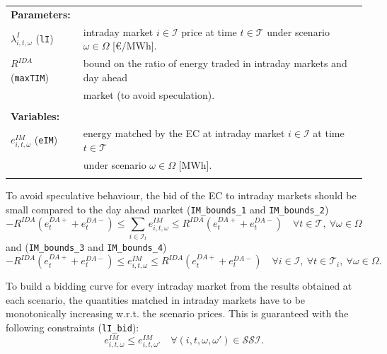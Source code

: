 \documentclass{article}
\begin{document}
\begin{tabularx}{\textwidth}{l l}
    
    \textbf{Parameters:} \\
    	$\lambda^I_{i, t, \omega}$ (\verb|lI|) & intraday market $i \in \mathcal{I}$ price at time $t \in \mathcal{T}$ under scenario $\omega \in \Omega$ [\euro/MWh]. \\
	$R^{IDA}$ (\verb|maxTIM|) & bound on the ratio of energy traded in intraday markets and day ahead \\
	& market (to avoid speculation).\\
    \\ 
       
    \textbf{Variables:} \\
    $e^{IM}_{i, t, \omega}$ (\verb|eIM|) & energy matched by the EC at intraday market $i \in \mathcal{I}$ at time $t \in \mathcal{T}$ \\
    & under scenario $\omega \in \Omega$ [MWh]. \\
	\\
\end{tabularx}

To avoid speculative behaviour, the bid of the EC to intraday markets should be small compared to the day ahead market (\verb|IM_bounds_1| and \verb|IM_bounds_2|)
\begin{equation} \label{EQ:DM_IM_1}
	-R^{IDA} (e^{DA+}_{t} + e^{DA-}_{t})  \leq \sum_{i \in \mathcal{I}_t} e^{IM}_{i, t, \omega} \leq R^{IDA} (e^{DA+}_{t} + e^{DA-}_{t}) \quad \forall t \in \mathcal{T}, \ \forall \omega \in \Omega
\end{equation}
and (\verb|IM_bounds_3| and \verb|IM_bounds_4|)
\begin{equation} \label{EQ:IM_bounds_3-4}
	-R^{IDA} (e^{DA+}_{t} + e^{DA-}_{t}) \leq e^{IM}_{i, t, \omega} \leq R^{IDA} (e^{DA+}_{t} + e^{DA-}_{t}) \quad \forall i \in \mathcal{I}, \ \forall t \in \mathcal{T}_i, \ \forall \omega \in \Omega.
\end{equation}

To build a bidding curve for every intraday market from the results obtained at each scenario, the quantities matched in intraday markets have to be monotonically increasing w.r.t. the scenario prices. This is guaranteed with the following constraints (\verb|lI_bid|):
\begin{equation} \label{EQ:lI_bid}
	e^{IM}_{i, t, \omega} \leq e^{IM}_{i, t, \omega'} \quad \forall (i, t, \omega, \omega') \in \mathcal{SSI}.
\end{equation}
\end{document}
